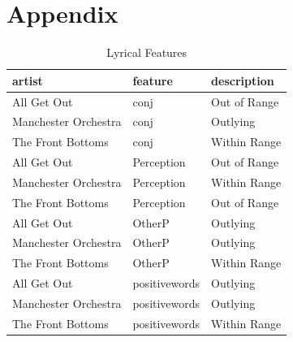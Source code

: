 \documentclass{article}\usepackage[]{graphicx}\usepackage[]{xcolor}
\begin{document}
\begin{multicols}{2}
\vspace{2em}
\end{multicols} 
\begin{tiny}

\end{tiny}

\pagebreak
\section{Appendix}

\begin{table}[H]
\centering
\begingroup\small
\begin{tabular}{lll}
  \hline
artist & feature & description \\ 
  \hline
All Get Out & conj & Out of Range \\ 
  Manchester Orchestra & conj & Outlying \\ 
  The Front Bottoms & conj & Within Range \\ 
  All Get Out & Perception & Out of Range \\ 
  Manchester Orchestra & Perception & Within Range \\ 
  The Front Bottoms & Perception & Out of Range \\ 
  All Get Out & OtherP & Outlying \\ 
  Manchester Orchestra & OtherP & Outlying \\ 
  The Front Bottoms & OtherP & Within Range \\ 
  All Get Out & positivewords & Outlying \\ 
  Manchester Orchestra & positivewords & Outlying \\ 
  The Front Bottoms & positivewords & Within Range \\ 
   \hline
\end{tabular}
\endgroup
\caption{Lyrical Features} 
\end{table}
\end{document}
